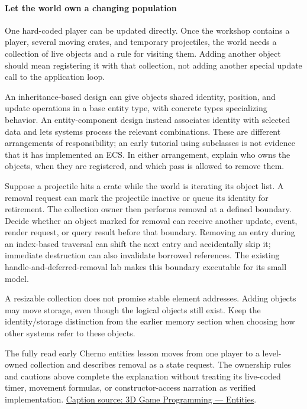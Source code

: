 \paragraph{Let the world own a changing population}\label{let-the-world-own-a-changing-population}

One hard-coded player can be updated directly. Once the workshop contains a player, several moving crates, and temporary projectiles, the world needs a collection of live objects and a rule for visiting them. Adding another object should mean registering it with that collection, not adding another special update call to the application loop.

An inheritance-based design can give objects shared identity, position, and update operations in a base entity type, with concrete types specializing behavior. An entity-component design instead associates identity with selected data and lets systems process the relevant combinations. These are different arrangements of responsibility; an early tutorial using subclasses is not evidence that it has implemented an ECS. In either arrangement, explain who owns the objects, when they are registered, and which pass is allowed to remove them.

Suppose a projectile hits a crate while the world is iterating its object list. A removal request can mark the projectile inactive or queue its identity for retirement. The collection owner then performs removal at a defined boundary. Decide whether an object marked for removal can receive another update, event, render request, or query result before that boundary. Removing an entry during an index-based traversal can shift the next entry and accidentally skip it; immediate destruction can also invalidate borrowed references. The existing handle-and-deferred-removal lab makes this boundary executable for its small model.

A resizable collection does not promise stable element addresses. Adding objects may move storage, even though the logical objects still exist. Keep the identity/storage distinction from the earlier memory section when choosing how other systems refer to these objects.

The fully read early Cherno entities lesson moves from one player to a level-owned collection and describes removal as a state request. The ownership rules and cautions above complete the explanation without treating its live-coded timer, movement formulas, or constructor-access narration as verified implementation. \href{https://www.youtube.com/watch?v=J3wfaJk_IMw}{Caption source: 3D Game Programming --- Entities}.

